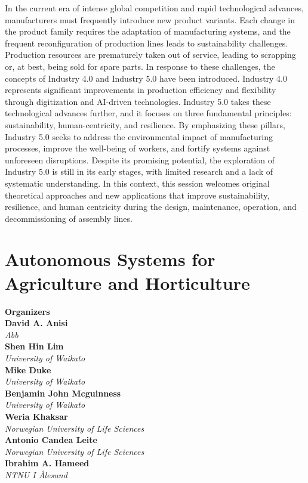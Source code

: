In the current era of intense global competition and rapid technological advances, manufacturers must frequently introduce new product variants. Each change in the product family requires the adaptation of manufacturing systems, and the frequent reconfiguration of production lines leads to sustainability challenges. Production resources are prematurely taken out of service, leading to scrapping or, at best, being sold for spare parts.  In response to these challenges, the concepts of Industry 4.0 and Industry 5.0 have been introduced. Industry 4.0 represents significant improvements in production efficiency and flexibility through digitization and AI-driven technologies. Industry 5.0 takes these technological advances further, and it focuses on three fundamental principles: sustainability, human-centricity, and resilience. By emphasizing these pillars, Industry 5.0 seeks to address the environmental impact of manufacturing processes, improve the well-being of workers, and fortify systems against unforeseen disruptions. Despite its promising potential, the exploration of Industry 5.0 is still in its early stages, with limited research and a lack of systematic understanding. In this context, this session welcomes original theoretical approaches and new applications that improve sustainability, resilience, and human centricity during the design, maintenance, operation, and decommissioning of assembly lines. 

\section{Autonomous Systems for Agriculture and Horticulture}


\large \textbf{Organizers} \normalsize \vspace{2mm} \\
\textbf{David A.  Anisi} \\ 
\textit{Abb} \vspace{{2mm}} \\
\textbf{Shen Hin  Lim} \\ 
\textit{University of Waikato} \vspace{{2mm}} \\
\textbf{Mike  Duke} \\ 
\textit{University of Waikato} \vspace{{2mm}} \\
\textbf{Benjamin John  Mcguinness} \\ 
\textit{University of Waikato} \vspace{{2mm}} \\
\textbf{Weria  Khaksar} \\ 
\textit{Norwegian University of Life Sciences} \vspace{{2mm}} \\
\textbf{Antonio  Candea Leite} \\ 
\textit{Norwegian University of Life Sciences} \vspace{{2mm}} \\
\textbf{Ibrahim  A. Hameed} \\ 
\textit{NTNU I Ålesund}

